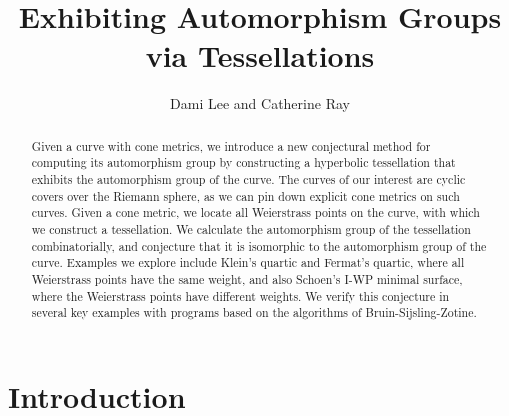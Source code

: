 \documentclass[12pt,reqno]{amsart}
\title{Exhibiting Automorphism Groups via Tessellations}
\author{Dami Lee and Catherine Ray}
\theoremstyle{definition}
\theoremstyle{remark}
\begin{document}
	
\maketitle

\begin{abstract}
Given a curve with cone metrics, we introduce a new conjectural method for computing its automorphism group by constructing a hyperbolic tessellation that exhibits the automorphism group of the curve. The curves of our interest are cyclic covers over the Riemann sphere, as we can pin down explicit cone metrics on such curves. Given a cone metric, we locate all Weierstrass points on the curve, with which we construct a tessellation. We calculate the automorphism group of the tessellation combinatorially, and conjecture that it is isomorphic to the automorphism group of the curve. Examples we explore include Klein's quartic and Fermat's quartic, where all Weierstrass points have the same weight, and also Schoen's I-WP minimal surface, where the Weierstrass points have different weights. We verify this conjecture in several key examples with programs based on the algorithms of Bruin-Sijsling-Zotine.
\end{abstract}



\section{Introduction}
\end{document}
